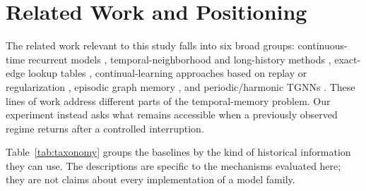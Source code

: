 \documentclass[conference]{IEEEtran}
\begin{document}
\section{Related Work and Positioning}
The related work relevant to this study falls into six broad groups: continuous-time recurrent models \cite{rossi2020tgn, trivedi2019dyrep, kumar2019jodie, xu2020tgat, chen2025towards}, temporal-neighborhood and long-history methods \cite{ma2020streaming, wang2020streaming, wang2021apan, wang2021caw, wang2021tcl, cong2023do, yu2023towards, zhao2025lifelong}, exact-edge lookup tables \cite{poursafaei2022towards, huang2023temporal, huang2024tgb2, huang2025benchmarking}, continual-learning approaches based on replay or regularization \cite{zhou2021overcoming, xu2020graphsail, liu2021lifelong, zhang2024continual, kou2020continual, kirkpatrick2017overcoming, liu2025continual}, episodic graph memory \cite{zhang2022neu, wang2025recurrent}, and periodic/harmonic TGNNs \cite{wang2021apan, gravina2024anti}. These lines of work address different parts of the temporal-memory problem. Our experiment instead asks what remains accessible when a previously observed regime returns after a controlled interruption.

Table~\ref{tab:taxonomy} groups the baselines by the kind of historical information they can use. The descriptions are specific to the mechanisms evaluated here; they are not claims about every implementation of a model family.
\end{document}
